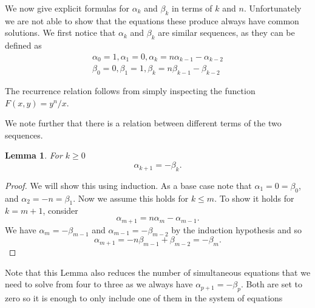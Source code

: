 \documentclass[12pt]{article}
\newtheorem{lemma}{Lemma}
\begin{document}
We now give explicit formulas for $\alpha_k$ and $\beta_k$ in terms of $k$ and $n$. Unfortunately we are not able to show that the equations these produce always have common solutions. 
We first notice that $\alpha_k$ and $\beta_k$ are similar sequences, as they can be defined as
\begin{align*}
\alpha_0 = 1, \alpha_1 = 0, \alpha_k = n\alpha_{k-1} - \alpha_{k-2}\\
\beta_0 = 0, \beta_1 = 1, \beta_k = n\beta_{k-1} - \beta_{k-2}
\end{align*}

The recurrence relation follows from simply inspecting the function $F(x,y) = y^n/x$.

We note further that there is a relation between different terms of the two sequences.  
\begin{lemma} 
\label{ab} For $k\geq 0$
\begin{equation*}
\alpha_{k+1} = - \beta_{k}.
\end{equation*}
\end{lemma}
\begin{proof}
We will show this using induction. As a base case note that $\alpha_1 = 0 = \beta_0$, and $\alpha_2 = -n = \beta_1$. Now we assume this holds for $k \leq m$. To show it holds for $k = m+1$, consider
\begin{equation*}
\alpha_{m+1} = n \alpha_{m} - \alpha_{m-1}.
\end{equation*}
We have $\alpha_m = -\beta_{m-1}$ and $\alpha_{m-1} = - \beta_{m-2}$ by the induction hypothesis and so 
\begin{equation*}
\alpha_{m+1} = - n \beta_{m-1} + \beta_{m-2} = -\beta_{m}.
\end{equation*}
\end{proof}
Note that this Lemma also reduces the number of simultaneous equations that we need to solve from four to three as we always have $\alpha_{p+1} = - \beta_{p}$. Both are set to zero so it is enough to only include one of them in the system of equations 
\end{document}
